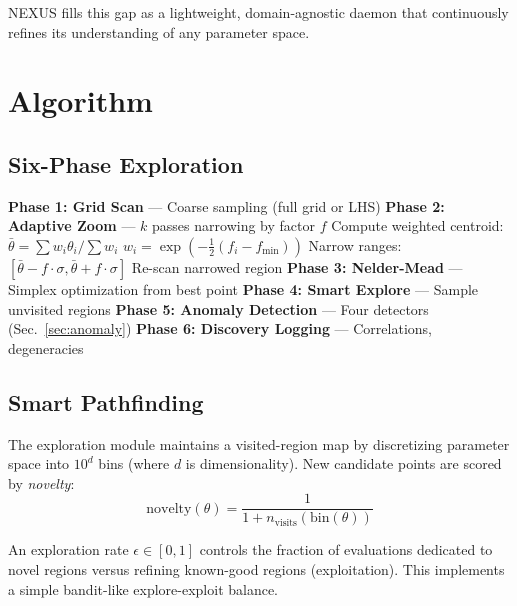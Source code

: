 \documentclass[twocolumn,prd,nofootinbib]{revtex4-2}
\begin{document}
\textsc{NEXUS} fills this gap as a lightweight, domain-agnostic daemon that continuously refines its understanding of any parameter space.

\section{Algorithm}

\subsection{Six-Phase Exploration}

\begin{algorithm}[h]
\caption{NEXUS Adaptive Scan}
\begin{algorithmic}[1]
\State \textbf{Phase 1: Grid Scan} — Coarse sampling (full grid or LHS)
\State \textbf{Phase 2: Adaptive Zoom} — $k$ passes narrowing by factor $f$
    \State Compute weighted centroid: $\bar{\theta} = \sum w_i \theta_i / \sum w_i$
    \State $w_i = \exp(-\frac{1}{2}(f_i - f_\mathrm{min}))$
    \State Narrow ranges: $[\bar{\theta} - f \cdot \sigma, \bar{\theta} + f \cdot \sigma]$
    \State Re-scan narrowed region
\EndFor
\State \textbf{Phase 3: Nelder-Mead} — Simplex optimization from best point
\State \textbf{Phase 4: Smart Explore} — Sample unvisited regions
\State \textbf{Phase 5: Anomaly Detection} — Four detectors (Sec.\ \ref{sec:anomaly})
\State \textbf{Phase 6: Discovery Logging} — Correlations, degeneracies
\end{algorithmic}
\end{algorithm}

\subsection{Smart Pathfinding}

The exploration module maintains a visited-region map by discretizing parameter space into $10^d$ bins (where $d$ is dimensionality). New candidate points are scored by \emph{novelty}:
\begin{equation}
    \mathrm{novelty}(\theta) = \frac{1}{1 + n_\mathrm{visits}(\mathrm{bin}(\theta))}
\end{equation}

An exploration rate $\epsilon \in [0, 1]$ controls the fraction of evaluations dedicated to novel regions versus refining known-good regions (exploitation). This implements a simple bandit-like explore-exploit balance.
\end{document}
